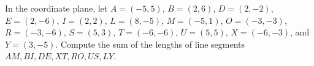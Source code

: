 In the coordinate plane, let $A=\left(-5,5\right)$, $B=\left(2,6\right)$, $D=\left(2,-2\right)$, $E=\left(2,-6\right)$, $I=\left(2,2\right)$, $L=\left(8,-5\right)$, $M=\left(-5,1\right)$, $O=\left(-3,-3\right)$, $R=\left(-3,-6\right)$, $S=\left(5,3\right)$, $T=\left(-6,-6\right)$, $U=\left(5,5\right)$, $X=\left(-6,-3\right)$, and $Y=\left(3,-5\right)$. Compute the sum of the lengths of line segments $AM,BI,DE,XT,RO,US,LY$.
